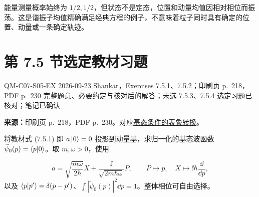 \begin{checkedsolution}
能量测量概率始终为 $1/2,1/2$，但状态不是定态，位置和动量均值因相对相位而振荡。这是谐振子均值精确满足经典方程的例子，不意味着粒子同时具有确定的位置、动量或一条确定轨迹。
\end{checkedsolution}

\section{第 7.5 节选定教材习题}
\label{exercise-set:QM-C07-S05}
\exercisemeta
  {QM-C07-S05-EX}
  {2026-09-23}
  {Shankar，Exercises 7.5.1、7.5.2；印刷页 p.~218，PDF p.~230}
  {完整题意、必要约定与核对后的解答；未选 7.5.3、7.5.4}
  {选定习题已核对；笔记已确认}

\noindent\begin{minipage}{\linewidth}
\textbf{来源：}印刷页 p.~218，PDF p.~230。对应\hyperref[topic:QM-C07-S05-T01]{基态条件的表象转换}。

将教材式 (7.5.1) 即 $a\left|0\right\rangle=0$ 投影到动量基，求归一化的基态波函数 $\widetilde\psi_0(p)=\left\langle p \middle| 0 \right\rangle$。取 $m,\omega>0$，使用
\par
\end{minipage}
\begin{equation}
  a=\sqrt{\frac{m\omega}{2\hbar}}X
     +\frac{\ii}{\sqrt{2m\hbar\omega}}P,\qquad
  P\mapsto p,\quad X\mapsto\ii\hbar\frac{\dd}{\dd p},
\end{equation}
以及 $\left\langle p \middle| p' \right\rangle=\delta(p-p')$、$\int|\widetilde\psi_0(p)|^2\dd p=1$。整体相位可自由选择。

